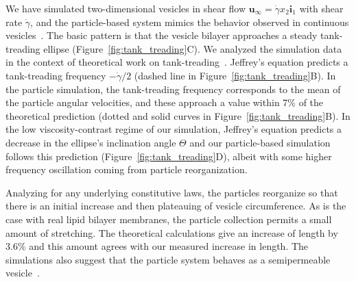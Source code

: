 We have simulated two-dimensional vesicles in shear flow
$\mathbf{u}_{\infty} = \dot{\gamma} x_2 \mathbf{i}_1$ with shear rate
$\dot{\gamma}$,
and the particle-based system mimics the behavior observed in continuous
vesicles~\cite{torres-sanchez_millan_arroyo_2019,
mahapatra_saintillan_rangamani_2020, Steigmann99, C6SM02452A}. The basic
pattern is that the vesicle bilayer approaches a steady tank-treading
ellipse (Figure~\ref{fig:tank_treading}C). We analyzed the simulation
data in the context of theoretical work on
tank-treading~\cite{Finken2008, PhysRevLett.106.158103}.
Jeffrey's equation predicts a
tank-treading frequency $-\dot{\gamma}/2$ (dashed line in
Figure~\ref{fig:tank_treading}B). In the particle simulation, the
tank-treading frequency corresponds to the mean of the particle angular
velocities, and these approach a value within 7\% of the theoretical
prediction (dotted and solid curves in Figure~\ref{fig:tank_treading}B).
In the low viscosity-contrast regime of our simulation, Jeffrey's
equation predicts a decrease in the ellipse's inclination angle $\Theta$
and our particle-based simulation follows this prediction
(Figure~\ref{fig:tank_treading}D), albeit with some higher frequency oscillation
coming from particle reorganization.


Analyzing for any underlying constitutive laws, the particles reorganize
so that there is an initial increase and then plateauing of vesicle
circumference. As is the case with real lipid bilayer membranes, the
particle collection permits a small amount of stretching. The
theoretical calculations give an increase of length by 3.6\% and this amount
agrees with our measured increase in length. The simulations also
suggest that the particle system behaves as a semipermeable
vesicle~\cite{323e9a2f0c58487ea82518d7a1f96485, YAO2017728}.

